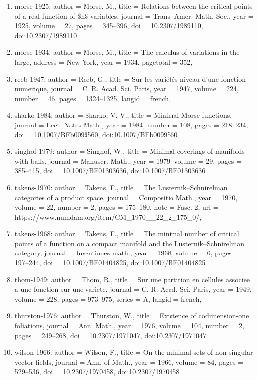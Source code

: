 \documentclass[11pt]{article}
\begin{document}
\begin{enumerate}[leftmargin=*]
  \item morse-1925: author = Morse, M., title = Relations between the critical points of a real function of \$n\$ variables, journal = Trans. Amer. Math. Soc., year = 1925, volume = 27, pages = 345--396, doi = 10.2307/1989110, \href{https://doi.org/10.2307/1989110}{doi:10.2307/1989110}
  \item morse-1934: author = Morse, M., title = The calculus of variations in the large, address = New York, year = 1934, pagetotal = 352,
  \item reeb-1947: author = Reeb, G., title = Sur les variétés niveau d'une fonction numerique, journal = C. R. Acad. Sci. Paris, year = 1947, volume = 224, number = 46, pages = 1324--1325, langid = french,
  \item sharko-1984: author = Sharko, V. V., title = Minimal Morse functions, journal = Lect. Notes Math., year = 1984, number = 108, pages = 218--234, doi = 10.1007/BFb0099560, \href{https://doi.org/10.1007/BFb0099560}{doi:10.1007/BFb0099560}
  \item singhof-1979: author = Singhof, W., title = Minimal coverings of manifolds with balls, journal = Manuscr. Math., year = 1979, volume = 29, pages = 385--415, doi = 10.1007/BF01303636, \href{https://doi.org/10.1007/BF01303636}{doi:10.1007/BF01303636}
  \item takens-1970: author = Takens, F., title = The Lusternik--Schnirelman categories of a product space, journal = Compositio Math., year = 1970, volume = 22, number = 2, pages = 175--180, note = Fasc. 2, url = https://www.numdam.org/item/CM\_1970\_\_22\_2\_175\_0/,
  \item takens-1968: author = Takens, F., title = The minimal number of critical points of a function on a compact manifold and the Lusternik--Schnirelman category, journal = Inventiones math., year = 1968, volume = 6, pages = 197--244, doi = 10.1007/BF01404825, \href{https://doi.org/10.1007/BF01404825}{doi:10.1007/BF01404825}
  \item thom-1949: author = Thom, R., title = Sur une partition en cellules associee a une fonction sur une variete, journal = C. R. Acad. Sci. Paris, year = 1949, volume = 228, pages = 973--975, series = A, langid = french,
  \item thurston-1976: author = Thurston, W., title = Existence of codimension-one foliations, journal = Ann. Math., year = 1976, volume = 104, number = 2, pages = 249--268, doi = 10.2307/1971047, \href{https://doi.org/10.2307/1971047}{doi:10.2307/1971047}
  \item wilson-1966: author = Wilson, F., title = On the minimal sets of non-singular vector fields, journal = Ann. of Math., year = 1966, volume = 84, pages = 529--536, doi = 10.2307/1970458, \href{https://doi.org/10.2307/1970458}{doi:10.2307/1970458}

\end{enumerate}
\end{document}
